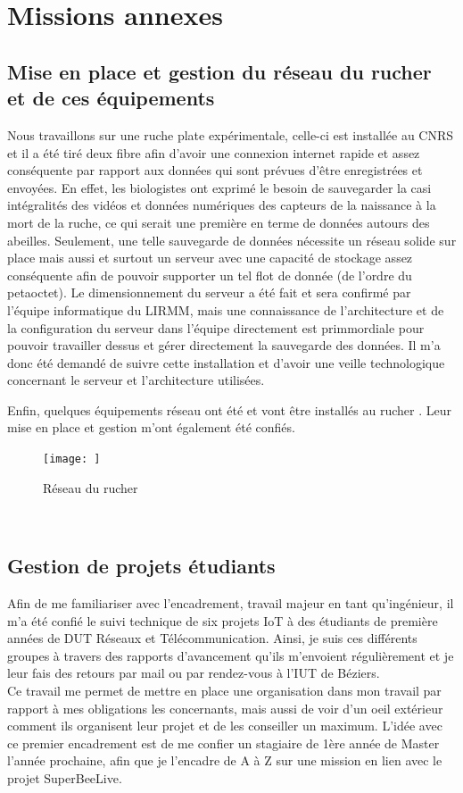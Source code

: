 \documentclass[11pt,french,a4paper]{report}
\begin{document}
\section{Missions annexes}
\subsection{Mise en place et gestion du réseau du rucher et de ces équipements}
Nous travaillons sur une ruche plate expérimentale, celle-ci est installée au CNRS et il a été tiré deux fibre afin d'avoir 
une connexion internet rapide et assez conséquente par rapport aux données qui sont prévues d'être enregistrées et envoyées. 
En effet, les biologistes ont exprimé le besoin de sauvegarder la casi intégralités des vidéos et données numériques des capteurs
de la naissance à la mort de la ruche, ce qui serait une première en terme de données autours des abeilles. Seulement, 
une telle sauvegarde de données nécessite un réseau solide sur place mais aussi et surtout un serveur avec une capacité 
de stockage assez conséquente afin de pouvoir supporter un tel flot de donnée (de l'ordre du petaoctet). 
Le dimensionnement du serveur a été fait et sera confirmé par l'équipe informatique du LIRMM, mais une connaissance 
de l'architecture et de la configuration du serveur dans l'équipe directement est primmordiale pour pouvoir travailler dessus
et gérer directement la sauvegarde des données. 
Il m'a donc été demandé de suivre cette installation et d'avoir une veille technologique concernant le serveur et l'architecture
utilisées. 

Enfin, quelques équipements réseau ont été et vont être installés au rucher . 
Leur mise en place et gestion m'ont également été confiés.

\begin{figure}
    \centering
    \texttt{[image: ]}
    \caption{Réseau du rucher}
    \label{reseau_rucher}
\end{figure} 


\subsection{Gestion de projets étudiants}
Afin de me familiariser avec l'encadrement, travail majeur en tant qu'ingénieur, il m'a été confié le suivi technique de six projets IoT 
à des étudiants de première années de DUT Réseaux et Télécommunication. Ainsi, je suis ces différents groupes à travers des rapports 
d'avancement qu'ils m'envoient régulièrement et je leur fais des retours par mail ou par rendez-vous à l'IUT de Béziers. \\
Ce travail me permet de mettre en place une organisation dans mon travail par rapport à mes obligations les concernants, mais aussi
de voir d'un oeil extérieur comment ils organisent leur projet et de les conseiller un maximum. 
L'idée avec ce premier encadrement est de me confier un stagiaire de 1ère année de Master l'année prochaine, afin que je l'encadre de A à Z 
sur une mission en lien avec le projet SuperBeeLive. 
\end{document}
